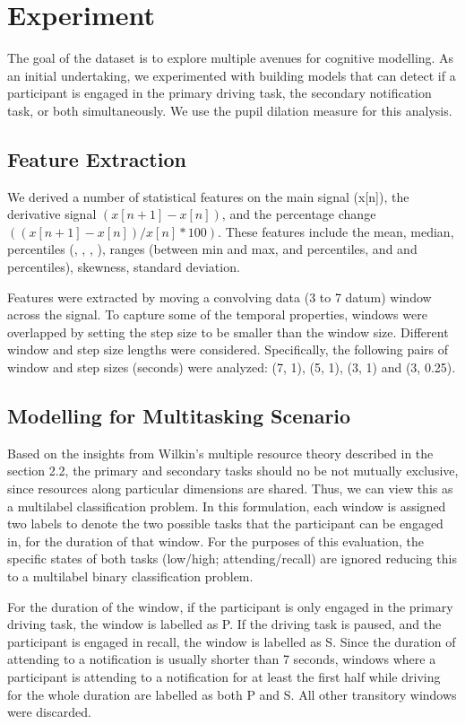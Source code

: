 \section{Experiment}
The goal of the dataset is to explore multiple avenues for cognitive modelling. As an initial undertaking, we experimented with building models that can detect if a participant is engaged in the primary driving task, the secondary notification task, or both simultaneously. We use the pupil dilation measure for this analysis.

\subsection{Feature Extraction}
We derived a number of statistical features on the main signal (x[n]), the derivative signal $(x[n+1] - x[n])$, and the percentage change $((x[n+1] - x[n])/x[n] * 100)$. These features include the mean, median, percentiles (, , , ), ranges (between min and max,  and  percentiles, and  and  percentiles), skewness, standard deviation.

Features were extracted by moving a convolving data (3 to 7 datum) window across the signal. To capture some of the temporal properties, windows were overlapped by setting the step size to be smaller than the window size. Different window and step size lengths were considered. Specifically, the following pairs of window and step sizes (seconds) were analyzed: (7, 1), (5, 1), (3, 1) and (3, 0.25). 

\subsection{Modelling for Multitasking Scenario}
Based on the insights from Wilkin's multiple resource theory described in the section 2.2,  the primary and secondary tasks should no be not mutually exclusive, since resources along particular dimensions are shared. Thus, we can view this as a multilabel classification problem. In this formulation, each window is assigned two labels to denote the two possible tasks that the participant can be engaged in, for the duration of that window. For the purposes of this evaluation, the specific states of both tasks (low/high; attending/recall) are ignored reducing this to a multilabel binary classification problem. 

For the duration of the window, if the participant is only engaged in the primary driving task, the window is labelled as P. If the driving task is paused, and the participant is engaged in recall, the window is labelled as S. Since the duration of attending to a notification is usually shorter than 7 seconds, windows where a participant is attending to a notification for at least the first half while driving for the whole duration are labelled as both P and S. All other transitory windows were discarded.   

